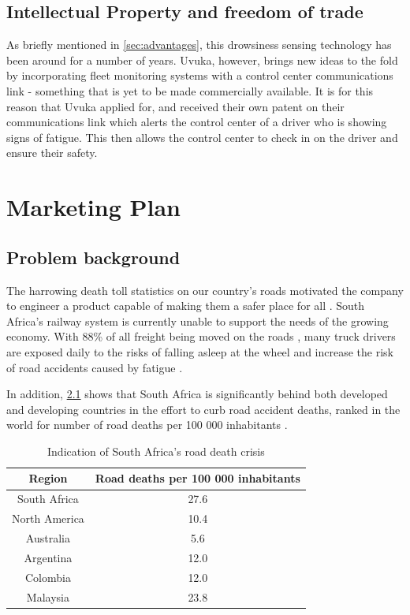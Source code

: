 \section{Intellectual Property and freedom of trade}
As briefly mentioned in \cref{sec:advantages}, this drowsiness sensing technology has been around for a number of years. Uvuka, however, brings new ideas to the fold by incorporating fleet monitoring systems with a control center communications link - something that is yet to be made commercially available. It is for this reason that Uvuka applied for, and received their own patent on their communications link which alerts the control center of a driver who is showing signs of fatigue. This then allows the control center to check in on the driver and ensure their safety.

\newpage
\chapter{Marketing Plan}
\section{Problem background}
The harrowing death toll statistics on our country's roads motivated the company to engineer a product capable of making them a safer place for all \cite{EWNRoadDeaths}. South Africa's railway system is currently unable to support the needs of the growing economy. With 88\% of all freight being moved on the roads \cite{BDlive_freight}, many truck drivers are exposed daily to the risks of falling asleep at the wheel \cite{ArriveAliveDriverTiredness} and increase the risk of road accidents caused by fatigue \cite{News24TruckersSleeping}.

In addition, \cref{tab:deaths100thousand} shows that South Africa is significantly behind both developed and developing countries in the effort to curb road accident deaths, ranked  in the world for number of road deaths per 100 000 inhabitants \cite{deathsPer100thousandStats}.

\begin{table}[htbp]
  \centering
  \caption{Indication of South Africa's road death crisis}
    \begin{tabular}{cc}
    \toprule
    \textbf{Region} & \textbf{Road deaths per 100 000 inhabitants} \\
    \midrule
    South Africa & 27.6 \\
    North America & 10.4 \\
    Australia & 5.6 \\
    Argentina & 12.0 \\
    Colombia & 12.0 \\
    Malaysia & 23.8 \\
    \bottomrule
    \end{tabular}%
  \label{tab:deaths100thousand}%
\end{table}%

